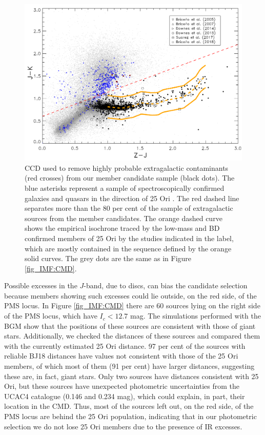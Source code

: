 \documentclass[12pt]{article}
\newcounter{subsubsubsection}[subsubsection]
\begin{document}
\begin{figure}
	\includegraphics[width=1.00\textwidth]{J-KvsZ-J}
	\caption[$J-K$ vs $Z-J$ diagram to remove potential extragalactic sources in our candidate sample.]{CCD used to remove highly probable extragalactic contaminants (red crosses) from our member candidate sample (black dots). The blue asterisks represent a sample of spectroscopically confirmed galaxies and quasars in the direction of 25 Ori \citep{Suarez2017}. The red dashed line separates more than the 80 per cent of the sample of extragalactic sources from the member candidates. The orange dashed curve shows the empirical isochrone traced by the low-mass and BD confirmed members of 25 Ori by the studies indicated in the label, which are mostly contained in the sequence defined by the orange solid curves. The grey dots are the same as in Figure \ref{fig_IMF:CMD}.}
	\label{fig_IMF:CCD}
\end{figure}

\label{sec_IMF:excesses}

Possible excesses in the $J$-band, due to discs, can bias the candidate selection because members showing such excesses could lie outside, on the red side, of the PMS locus. In Figure \ref{fig_IMF:CMD} there are 60 sources lying on the right side of the PMS locus, which have $I_c<12.7$ mag. The simulations performed with the BGM show that the positions of these sources are consistent with those of giant stars. Additionally, we checked the distances of these sources and compared them with the currently estimated 25 Ori distance. 97 per cent of the sources with reliable BJ18 distances have values not consistent with those of the 25 Ori members, of which most of them (91 per cent) have larger distances, suggesting these are, in fact, giant stars. Only two sources have distances consistent with 25 Ori, but these sources have unexpected photometric uncertainties from the UCAC4 catalogue (0.146 and 0.234 mag), which could explain, in part, their location in the CMD. Thus, most of the sources left out, on the red side, of the PMS locus are behind the 25 Ori population, indicating that in our photometric selection we do not lose 25 Ori members due to the presence of IR excesses.
\end{document}
